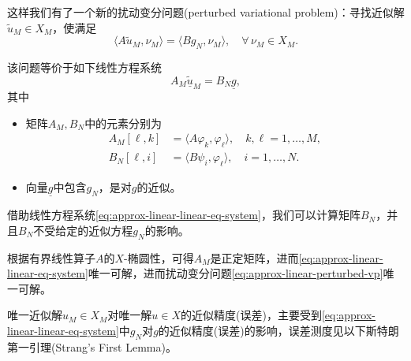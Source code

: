 这样我们有了一个新的扰动变分问题(perturbed variational problem)：寻找近似解$\tilde{u}_{M} \in X_{M}$，使满足
\begin{equation}
  \label{eq:approx-linear-perturbed-vp}
  \langle A \tilde{u}_{M}, \nu_{M} \rangle
  =\langle B g_{N}, \nu_{M} \rangle, \quad \forall \, \nu_{M} \in X_{M}.
\end{equation}

该问题等价于如下线性方程系统
\begin{equation}
  \label{eq:approx-linear-linear-eq-system}
  A_{M} \underline{\tilde{u}}_{M} = B_{N} \underline{g},
\end{equation}
其中
\begin{itemize}
  \item 矩阵$A_{M},B_{N}$中的元素分别为
  \begin{equation*}
    \begin{split}
      A_{M}\left[ \ell, k \right] & = \langle A \varphi_{k}, \varphi_{\ell} \rangle, \quad k,\ell = 1,\ldots,M,\\
      B_{N} \left[ \ell, i \right] & = \langle B \psi_{i}, \varphi_{\ell} \rangle, \quad i=1,\ldots,N.
    \end{split}
  \end{equation*}
  \item 向量$\underline{g}$中包含$g_{N}$，是对$g$的近似。
\end{itemize}

借助线性方程系统\eqref{eq:approx-linear-linear-eq-system}，我们可以计算矩阵$B_{N}$，并且$B_{N}$不受给定的近似方程$g_{N}$的影响。

根据有界线性算子$A$的$X$-椭圆性，可得$A_{M}$是正定矩阵，进而\eqref{eq:approx-linear-linear-eq-system}唯一可解，进而扰动变分问题\eqref{eq:approx-linear-perturbed-vp}唯一可解。

唯一近似解$u_{M} \in X_{M}$对唯一解$u \in X$的近似精度(误差)，主要受到\eqref{eq:approx-linear-linear-eq-system}中$g_{N}$对$g$的近似精度(误差)的影响，误差测度见以下斯特朗第一引理(Strang's First Lemma)。

